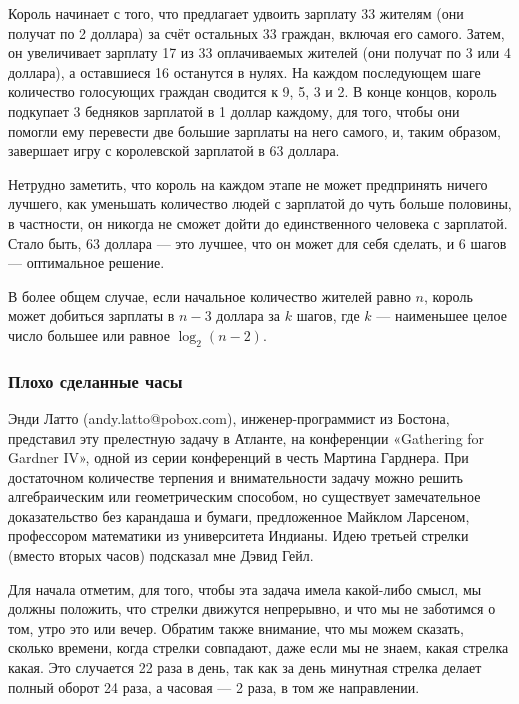 Король начинает с того, что предлагает удвоить зарплату 33 жителям (они получат по 2 доллара) за счёт остальных 33 граждан, включая его самого.
Затем, он увеличивает зарплату 17 из 33 оплачиваемых жителей (они получат по 3 или 4 доллара), а оставшиеся 16 останутся в нулях.
На каждом последующем шаге количество голосующих граждан сводится к 9, 5, 3 и 2.
В конце концов, король подкупает 3 бедняков зарплатой в 1 доллар каждому, для того, чтобы они помогли ему перевести две большие зарплаты на него самого, и, таким образом, завершает игру с королевской зарплатой в 63 доллара.

Нетрудно заметить, что король на каждом этапе не может предпринять ничего лучшего, как уменьшать количество людей с зарплатой до чуть больше половины, в частности, он никогда не сможет дойти до единственного человека с зарплатой.
Стало быть, 63 доллара --- это лучшее, что он может для себя сделать, и 6 шагов --- оптимальное решение.
\heart

В более общем случае, если начальное количество жителей равно $n$, король может добиться зарплаты в $n-3$ доллара за $k$ шагов, где $k$ --- наименьшее целое число большее или равное $\log_2(n-2)$.

\subsubsection*{Плохо сделанные часы}%

Энди Латто %
(andy.latto@pobox.com), инженер-программист из Бостона, представил эту прелестную задачу в Атланте, на конференции «Gathering for Gardner IV», одной из серии конференций в честь Мартина Гарднера.
При достаточном количестве терпения и внимательности задачу можно решить алгебраическим или геометрическим способом, но существует замечательное доказательство %
без карандаша и бумаги, предложенное Майклом Ларсеном, %
профессором математики из университета Индианы.
Идею третьей стрелки (вместо вторых часов) подсказал мне Дэвид Гейл. %

Для начала отметим, для того, чтобы эта задача имела какой-либо смысл, мы должны положить, что стрелки движутся непрерывно, и что мы не заботимся о том, утро это или вечер.
Обратим также внимание, что мы можем сказать, сколько времени, когда стрелки совпадают, даже если мы не знаем, какая стрелка какая.
Это случается 22 раза в день, так как за день минутная стрелка делает полный оборот 24 раза, а часовая --- 2 раза, в том же направлении.

